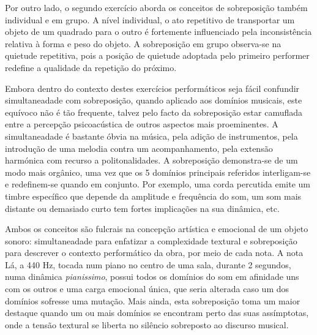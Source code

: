 \documentclass[../main.tex]{subfiles}
\begin{document}
Por outro lado, o segundo exercício aborda os conceitos de sobreposição também individual e em grupo. A nível individual, o ato repetitivo de transportar um objeto de um quadrado para o outro é fortemente influenciado pela inconsistência relativa à forma e peso do objeto. A sobreposição em grupo observa-se na quietude repetitiva, pois a posição de quietude adoptada pelo primeiro performer redefine a qualidade da repetição do próximo.

Embora dentro do contexto destes exercícios performáticos seja fácil confundir simultaneadade com sobreposição, quando aplicado aos domínios musicais, este equívoco não é tão frequente, talvez pelo facto da sobreposição estar camuflada entre a percepção psicoacústica de outros aspectos mais proeminentes. A simultaneadade é bastante óbvia na música, pela adição de instrumentos, pela introdução de uma melodia contra um acompanhamento, pela extensão harmónica com recurso a politonalidades. A sobreposição demonstra-se de um modo mais orgânico, uma vez que os 5 domínios principais referidos interligam-se e redefinem-se quando em conjunto. Por exemplo, uma corda percutida emite um timbre específico que depende da amplitude e frequência do som\cite{benade}, um som mais distante ou demasiado curto tem fortes implicações na sua dinâmica, etc.

Ambos os conceitos são fulcrais na concepção artística e emocional de um objeto sonoro: simultaneadade para enfatizar a complexidade textural e sobreposição para descrever o contexto performático da obra, por meio de cada nota. A nota Lá, a 440 Hz, tocada num piano no centro de uma sala, durante 2 segundos, numa dinâmica \textsl{pianissimo}, possui todos os domínios do som em afinidade uns com os outros e uma carga emocional única, que seria alterada caso um dos domínios sofresse uma mutação. Mais ainda, esta sobreposição toma um maior destaque quando um ou mais domínios se encontram perto das suas assímptotas, onde a tensão textural se liberta no silêncio sobreposto ao discurso musical.

\end{document}
